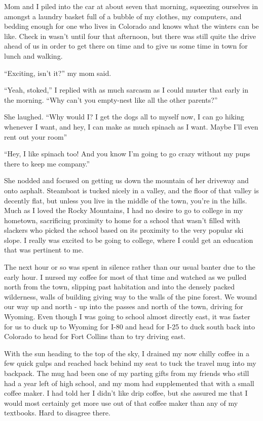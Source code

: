 Mom and I piled into the car at about seven that morning, squeezing ourselves in amongst a laundry basket full of a bubble of my clothes, my computers, and bedding enough for one who lives in Colorado and knows what the winters can be like.  Check in wasn't until four that afternoon, but there was still quite the drive ahead of us in order to get there on time and to give us some time in town for lunch and walking.

``Exciting, isn't it?'' my mom said.

``Yeah, stoked,'' I replied with as much sarcasm as I could muster that early in the morning.  ``Why can't you empty-nest like all the other parents?''

She laughed.  ``Why would I?  I get the dogs all to myself now, I can go hiking whenever I want, and hey, I can make as much spinach as I want.  Maybe I'll even rent out your room''

``Hey, I like spinach too!  And you know I'm going to go crazy without my pups there to keep me company.''

She nodded and focused on getting us down the mountain of her driveway and onto asphalt.  Steamboat is tucked nicely in a valley, and the floor of that valley is decently flat, but unless you live in the middle of the town, you're in the hills.  Much as I loved the Rocky Mountains, I had no desire to go to college in my hometown, sacrificing proximity to home for a school that wasn't filled with slackers who picked the school based on its proximity to the very popular ski slope.  I really was excited to be going to college, where I could get an education that was pertinent to me.

The next hour or so was spent in silence rather than our usual banter due to the early hour.  I nursed my coffee for most of that time and watched as we pulled north from the town, slipping past habitation and into the densely packed wilderness, walls of building giving way to the walls of the pine forest.  We wound our way up and north - up into the passes and north of the town, driving for Wyoming.  Even though I was going to school almost directly east, it was faster for us to duck up to Wyoming for I-80 and head for I-25 to duck south back into Colorado to head for Fort Collins than to try driving east.

With the sun heading to the top of the sky, I drained my now chilly coffee in a few quick gulps and reached back  behind my seat to tuck the travel mug into my backpack.  The mug had been one of my parting gifts from my friends who still had a year left of high school, and my mom had supplemented that with a small coffee maker.  I had told her I didn't like drip coffee, but she assured me that I would most certainly get more use out of that coffee maker than any of my textbooks.  Hard to disagree there.

